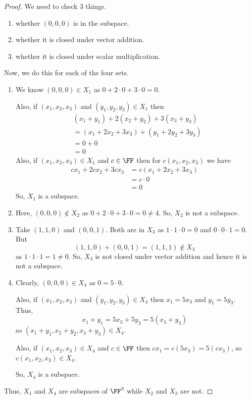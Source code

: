 \begin{proof}
We need to check 3 things.
\begin{enumerate}
\item[1)] whether $(0,0,0)$ is in the subspace.
\item[2)] whether it is closed under vector addition.
\item[3)] whether it is closed under scalar multiplication.
\end{enumerate}
Now, we do this for each of the four sets.
\begin{enumerate}
\item[(a)] We know $(0,0,0) \in X_1$ as $0 + 2 \cdot 0 + 3 \cdot 0 = 0$.

Also, if $(x_1, x_2, x_3)$ and $(y_1, y_2, y_3) \in X_1$ then
\begin{align*}
& (x_1 + y_1) + 2(x_2 + y_2) + 3(x_3 + y_3) \\
&= (x_1 + 2x_2 + 3x_3) + (y_1 + 2y_2 + 3y_3) \\
&= 0 + 0 \\
&= 0
\end{align*}
Also, if $(x_1, x_2, x_3) \in X_1$ and $c \in \FF$ then for $c(x_1, x_2, x_3)$ we have
\begin{align*}
cx_1 + 2cx_2 + 3cx_3 &= c(x_1 + 2x_2 + 3x_3) \\
&= c \cdot 0 \\
&= 0
\end{align*}
So, $X_1$ is a subspace.
\item[(b)] Here, $(0,0,0) \notin X_2$ as $0 + 2 \cdot 0 + 3 \cdot 0 = 0 \neq 4$. So, $X_2$ is not a subspace.
\item[(c)] Take $(1,1,0)$ and $(0,0,1)$. Both are in $X_3$ as $1 \cdot 1 \cdot 0 = 0$ and $0 \cdot 0 \cdot 1 = 0$. But
\[
(1,1,0) + (0,0,1) = (1,1,1) \notin X_3
\]
as $1 \cdot 1 \cdot 1 = 1 \neq 0$. So, $X_3$ is not closed under vector addition and hence it is not a subspace.
\item[(d)] Clearly, $(0,0,0) \in X_4$ as $0 = 5 \cdot 0$.

Also, if $(x_1, x_2, x_3)$ and $(y_1, y_2, y_3) \in X_4$ then $x_1 = 5x_3$ and $y_1 = 5y_3$. Thus,
\[
x_1 + y_1 = 5x_3 + 5y_3 = 5(x_3 + y_3)
\]
so $(x_1 + y_1, x_2 + y_2, x_3 + y_3) \in X_4$.

Also, if $(x_1, x_2, x_3) \in X_4$ and $c \in \FF$ then $cx_1 = c(5x_3) = 5(cx_3)$, so $c(x_1, x_2, x_3) \in X_4$.

So, $X_4$ is a subspace.
\end{enumerate}
Thus, $X_1$ and $X_4$ are subspaces of $\FF^3$ while $X_2$ and $X_3$ are not.
\end{proof}

